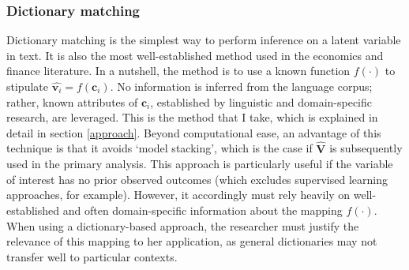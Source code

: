 \documentclass[12pt,a4]{article}
\begin{document}
\subsubsection{Dictionary matching}
Dictionary matching is the simplest way to perform inference on a latent variable in text. It is also the most well-established method used in the economics and finance literature. In a nutshell, the method is to use a known function \(f(\cdot)\) to stipulate \(\hat{\mathbf{v}_i} = f(\mathbf{c}_i)\). No information is inferred from the language corpus; rather, known attributes of \(\mathbf{c}_i\), established by linguistic and domain-specific research, are leveraged. This is the method that I take, which is explained in detail in section \ref{approach}. Beyond computational ease, an advantage of this technique is that it avoids `model stacking', which is the case if \(\hat{\mathbf{V}}\) is subsequently used in the primary analysis. This approach is particularly useful if the variable of interest has no prior observed outcomes (which excludes supervised learning approaches, for example). However, it accordingly must rely heavily on well-established and often domain-specific information about the mapping \(f(\cdot  )\). When using a dictionary-based approach, the researcher must justify the relevance of this mapping to her application, as general dictionaries may not transfer well to particular contexts. 
\end{document}

